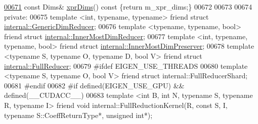 \begin{DoxyCode}
\hyperlink{struct_eigen_1_1_tensor_evaluator_3_01const_01_tensor_reduction_op_3_01_op_00_01_dims_00_01_arg_4fdf2ec1445de4704eb590bc98040dc6_af792d6b76a129fcd1b070d1d893299d3}{00671}   \textcolor{keyword}{const} Dims& \hyperlink{struct_eigen_1_1_tensor_evaluator_3_01const_01_tensor_reduction_op_3_01_op_00_01_dims_00_01_arg_4fdf2ec1445de4704eb590bc98040dc6_af792d6b76a129fcd1b070d1d893299d3}{xprDims}()\textcolor{keyword}{ const }\{\textcolor{keywordflow}{return} m\_xpr\_dims;\}
00672 
00673 
00674   \textcolor{keyword}{private}:
00675   \textcolor{keyword}{template} <\textcolor{keywordtype}{int}, \textcolor{keyword}{typename}, \textcolor{keyword}{typename}> \textcolor{keyword}{friend} \textcolor{keyword}{struct }\hyperlink{struct_eigen_1_1internal_1_1_generic_dim_reducer}{internal::GenericDimReducer};
00676   \textcolor{keyword}{template} <\textcolor{keyword}{typename}, \textcolor{keyword}{typename}, \textcolor{keywordtype}{bool}> \textcolor{keyword}{friend} \textcolor{keyword}{struct }
      \hyperlink{struct_eigen_1_1internal_1_1_inner_most_dim_reducer}{internal::InnerMostDimReducer};
00677   \textcolor{keyword}{template} <\textcolor{keywordtype}{int}, \textcolor{keyword}{typename}, \textcolor{keyword}{typename}, \textcolor{keywordtype}{bool}> \textcolor{keyword}{friend} \textcolor{keyword}{struct }
      \hyperlink{struct_eigen_1_1internal_1_1_inner_most_dim_preserver}{internal::InnerMostDimPreserver};
00678   \textcolor{keyword}{template} <\textcolor{keyword}{typename} S, \textcolor{keyword}{typename} O, \textcolor{keyword}{typename} D, \textcolor{keywordtype}{bool} V> \textcolor{keyword}{friend} \textcolor{keyword}{struct }
      \hyperlink{struct_eigen_1_1internal_1_1_full_reducer}{internal::FullReducer};
00679 \textcolor{preprocessor}{#ifdef EIGEN\_USE\_THREADS}
00680   \textcolor{keyword}{template} <\textcolor{keyword}{typename} S, \textcolor{keyword}{typename} O, \textcolor{keywordtype}{bool} V> \textcolor{keyword}{friend} \textcolor{keyword}{struct }internal::FullReducerShard;
00681 \textcolor{preprocessor}{#endif}
00682 \textcolor{preprocessor}{#if defined(EIGEN\_USE\_GPU) && defined(\_\_CUDACC\_\_)}
00683   \textcolor{keyword}{template} <\textcolor{keywordtype}{int} B, \textcolor{keywordtype}{int} N, \textcolor{keyword}{typename} S, \textcolor{keyword}{typename} R, \textcolor{keyword}{typename} I> \textcolor{keyword}{friend} \textcolor{keywordtype}{void} internal::FullReductionKernel(R, \textcolor{keyword}{
      const} S, I, \textcolor{keyword}{typename} S::CoeffReturnType*, \textcolor{keywordtype}{unsigned} \textcolor{keywordtype}{int}*);

\end{DoxyCode}
